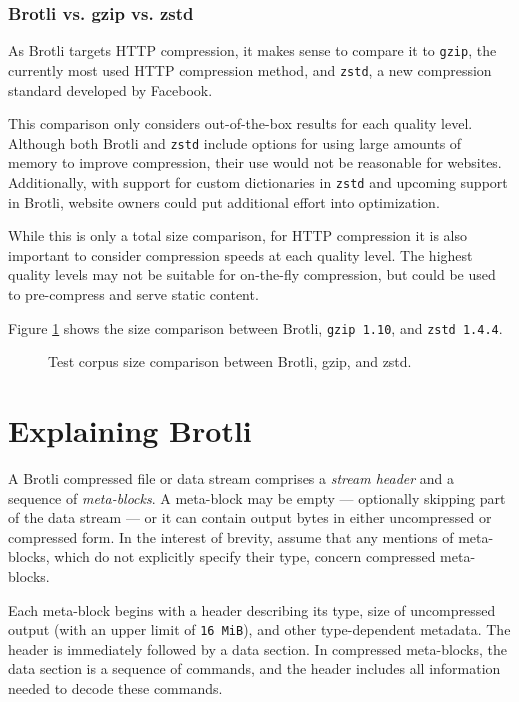 \documentclass[english,master,dept460,male,cpp,cpdeclaration]{diploma}
\newcommand{\tikzfigure}[1]{
	\tikzsetnextfilename{#1}%
}
\begin{document}
	\fi %
	
		\subsubsection{Brotli vs. gzip vs. zstd}
		
		As Brotli targets HTTP compression, it makes sense to compare it to \verb|gzip|, the currently most used HTTP compression method, and \verb|zstd|, a new compression standard developed by Facebook.
		
		This comparison only considers out-of-the-box results for each quality level. Although both Brotli and \texttt{zstd} include options for using large amounts of memory to improve compression, their use would not be reasonable for websites. Additionally, with support for custom dictionaries in \verb|zstd| and upcoming support in Brotli, website owners could put additional effort into optimization.
		
		While this is only a total size comparison, for HTTP compression it is also important to consider compression speeds at each quality level. The highest quality levels may not be suitable for on-the-fly compression, but could be used to pre-compress and serve static content.
		
		Figure \ref{fig:test-corpus-comparison} shows the size comparison between Brotli, \verb|gzip 1.10|, and \verb|zstd 1.4.4|.
		
		\begin{figure}[H]
			\tikzfigure{test-corpus-comparison}
			\caption{Test corpus size comparison between Brotli, gzip, and zstd.}
			\label{fig:test-corpus-comparison}
		\end{figure}

\section{Explaining Brotli}
\label{sec:explaining-brotli}

A Brotli compressed file or data stream comprises a \emph{stream header} and a sequence of \emph{meta-blocks}. A meta-block may be empty --- optionally skipping part of the data stream --- or it can contain output bytes in either uncompressed or compressed form. In the interest of brevity, assume that any mentions of meta-blocks, which do not explicitly specify their type, concern compressed meta-blocks.

Each meta-block begins with a header describing its type, size of uncompressed output (with an upper limit of \verb|16 MiB|), and other type-dependent metadata. The header is immediately followed by a data section. In compressed meta-blocks, the data section is a sequence of commands, and the header includes all information needed to decode these commands.
\end{document}
